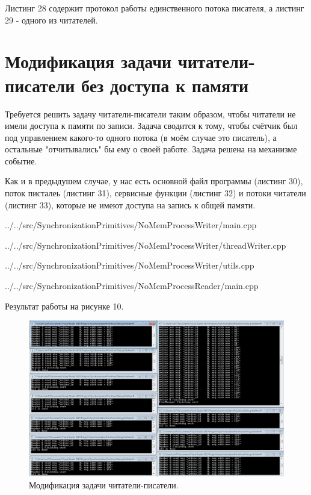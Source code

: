\documentclass[a4paper, 12pt]{article}		%
\begin{document}
Листинг 28 содержит протокол работы единственного потока писателя, а листинг 29 - одного из читателей.





\newpage
\section{Модификация задачи читатели-писатели без доступа к памяти}

Требуется решить задачу читатели-писатели таким образом, чтобы читатели не имели доступа к памяти по записи. Задача сводится к тому, чтобы счётчик был под управлением какого-то одного потока (в моём случае это писатель), а остальные "отчитывались" бы ему о своей работе. Задача решена на механизме событие.

Как и в предыдушем случае, у нас есть основной файл программы (листинг 30), поток писталеь (листинг 31), сервисные функции (листинг 32) и потоки читатели (листинг 33), которые не имеют доступа на запись к общей памяти.


{../../src/SynchronizationPrimitives/NoMemProcessWriter/main.cpp}


{../../src/SynchronizationPrimitives/NoMemProcessWriter/threadWriter.cpp}


{../../src/SynchronizationPrimitives/NoMemProcessWriter/utils.cpp}
\newpage


{../../src/SynchronizationPrimitives/NoMemProcessReader/main.cpp}
\newpage

Результат работы на рисунке 10.

\begin{figure}[h!]
\centering
\includegraphics[scale=0.50]{res/008}
\caption{Модификация задачи читатели-писатели.}
\end{figure}
\end{document}
